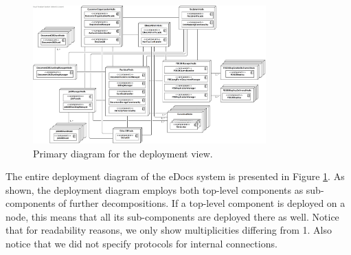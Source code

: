 \documentclass[a4paper,10pt]{article}
\begin{document}
\begin{figure}[!htp]
    \centering
	\includegraphics[width=0.8\textwidth]{TotalDeployment.png}
    \caption{Primary diagram for the deployment view.}
    \label{fig:depl_primary}
\end{figure}
\FloatBarrier
\noindent
The entire deployment diagram of the eDocs system is presented in Figure \ref{fig:depl_primary}. As shown, the deployment diagram employs both top-level components as sub-components of further decompositions. If a top-level component is deployed on a node, this means that all its sub-components are deployed there as well. Notice that for readability reasons, we only show multiplicities differing from 1. Also notice that we did not specify protocols for internal connections.\\
\end{document}
